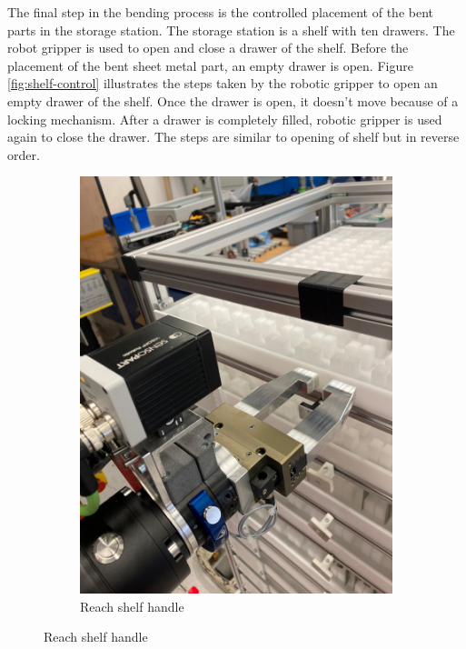 The final step in the bending process is the controlled placement of the bent parts in the storage station. The storage station is a shelf with ten drawers. The robot gripper is used to open and close a drawer of the shelf.
Before the placement of the bent sheet metal part, an empty drawer is open. Figure \ref{fig:shelf-control} illustrates the steps taken by the robotic gripper to open an empty drawer of the shelf. Once the drawer is open, it doesn't move because of a locking mechanism. After a drawer is completely filled, robotic gripper is used again to close the drawer. The steps are similar to opening of shelf but in reverse order.
\FloatBarrier
\begin{figure}[!ht]
    \centering
    \begin{subfigure}[b]{0.32\textwidth}
        \centering
        \includegraphics[width=\textwidth]{figures/shelf-control/reach-handle.jpeg}
        \caption{Reach shelf handle}
        \label{subfig:reach-handle}
    \end{subfigure}\hspace{0.1cm}

\end{figure}
